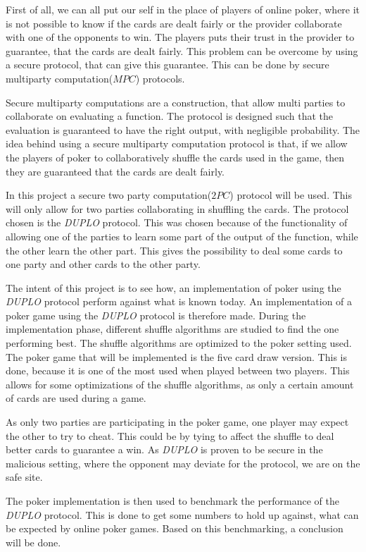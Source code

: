 \documentclass[twoside,11pt,openright]{report}
\newcommand{\DUPLO}{\textit{DUPLO} }
\begin{document}
First of all, we can all put our self in the place of players of online poker, where it is not possible to know if the cards are dealt fairly or the provider collaborate with one of the opponents to win. The players puts their trust in the provider to guarantee, that the cards are dealt fairly. This problem can be overcome by using a secure protocol, that can give this guarantee. This can be done by secure multiparty computation($MPC$) protocols.

Secure multiparty computations are a construction, that allow multi parties to collaborate on evaluating a function. The protocol is designed such that the evaluation is guaranteed to have the right output, with negligible probability. The idea behind using a secure multiparty computation protocol is that, if we allow the players of poker to collaboratively shuffle the cards used in the game, then they are guaranteed that the cards are dealt fairly.

In this project a secure two party computation($2PC$) protocol will be used. This will only allow for two parties collaborating in shuffling the cards. The protocol chosen is the \DUPLO protocol. This was chosen because of the functionality of allowing one of the parties to learn some part of the output of the function, while the other learn the other part. This gives the possibility to deal some cards to one party and other cards to the other party.

The intent of this project is to see how, an implementation of poker using the \DUPLO protocol perform against what is known today. An implementation of a poker game using the \DUPLO protocol is therefore made. During the implementation phase, different shuffle algorithms are studied to find the one performing best. The shuffle algorithms are optimized to the poker setting used. The poker game that will be implemented is the five card draw version. This is done, because it is one of the most used when played between two players. This allows for some optimizations of the shuffle algorithms, as only a certain amount of cards are used during a game.

As only two parties are participating in the poker game, one player may expect the other to try to cheat. This could be by tying to affect the shuffle to deal better cards to guarantee a win. As \DUPLO is proven to be secure in the malicious setting, where the opponent may deviate for the protocol, we are on the safe site.

The poker implementation is then used to benchmark the performance of the \DUPLO protocol. This is done to get some numbers to hold up against, what can be expected by online poker games. Based on this benchmarking, a conclusion will be done.
\end{document}
